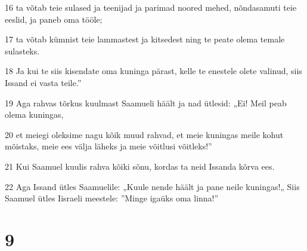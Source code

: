 \par 16 ta võtab teie sulased ja teenijad ja parimad noored mehed, nõndasamuti teie eeslid, ja paneb oma tööle;
\par 17 ta võtab kümnist teie lammastest ja kitsedest ning te peate olema temale sulasteks.
\par 18 Ja kui te siis kisendate oma kuninga pärast, kelle te enestele olete valinud, siis Issand ei vasta teile.”
\par 19 Aga rahvas tõrkus kuulmast Saamueli häält ja nad ütlesid: „Ei! Meil peab olema kuningas,
\par 20 et meiegi oleksime nagu kõik muud rahvad, et meie kuningas meile kohut mõistaks, meie ees välja läheks ja meie võitlusi võitleks!”
\par 21 Kui Saamuel kuulis rahva kõiki sõnu, kordas ta neid Issanda kõrva ees.
\par 22 Aga Issand ütles Saamuelile: „Kuule nende häält ja pane neile kuningas!„ Siis Saamuel ütles Iisraeli meestele: ”Minge igaüks oma linna!”

\chapter{9}

